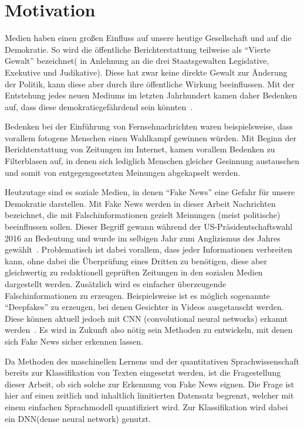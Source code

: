 \section{Motivation}
Medien haben einen großen Einfluss auf unsere heutige Gesellschaft und auf die Demokratie.
So wird die öffentliche Berichterstattung teilweise als \enquote{Vierte Gewalt} bezeichnet( 
in Anlehnung an die drei Staatsgewalten Legislative, Exekutive und Judikative). Diese hat 
zwar keine direkte Gewalt zur Änderung der Politik, kann diese aber durch ihre öffentliche 
Wirkung beeinflussen. Mit der Entstehung jedes neuen Mediums im letzten Jahrhundert kamen daher 
Bedenken auf, dass diese demokratiegefährdend sein könnten~\cite{hunt_fake}.
 
Bedenken bei der Einführung von Fernsehnachrichten waren beispielsweise, dass vorallem fotogene Menschen
einen Wahlkampf gewinnen würden. Mit Beginn der Berichterstattung von Zeitungen im Internet,
kamen vorallem Bedenken zu Filterblasen auf, in denen sich lediglich Menschen gleicher 
Gesinnung austauschen und somit von entgegengesetzten Meinungen abgekapselt werden.

Heutzutage sind es soziale Medien, in denen \enquote{Fake News} eine Gefahr für unsere Demokratie 
darstellen. Mit Fake News werden in dieser Arbeit Nachrichten bezeichnet, die mit Falschinformationen
gezielt Meinungen (meist politische) beeinflussen sollen. Dieser Begriff gewann während der 
US-Präsidentschaftswahl 2016 an Bedeutung und wurde im selbigen Jahr zum Anglizismus des Jahres gewählt~\cite{nzz}.
Problematisch ist dabei vorallem, dass jeder Informationen verbreiten 
kann, ohne dabei die Überprüfung eines Dritten zu benötigen, diese aber gleichwertig
zu redaktionell geprüften Zeitungen in den sozialen Medien dargestellt werden. Zusätzlich 
wird es einfacher überzeugende Falschinformationen zu erzeugen. Beispielsweise ist es möglich
sogenannte \enquote{Deepfakes} zu erzeugen, bei denen Gesichter in Videos ausgetauscht werden.
Diese können aktuell jedoch mit CNN (convolutional neural networks) erkannt werden~\cite{deepfake}.
Es wird in Zukunft also nötig sein Methoden zu entwickeln, mit denen sich Fake News sicher erkennen lassen.

Da Methoden des maschinellen Lernens und der quantitativen Sprachwissenschaft bereits zur Klassifikation
von Texten eingesetzt werden, ist die Fragestellung dieser Arbeit, ob sich solche zur Erkennung 
von Fake News eignen. Die Frage ist hier auf einen zeitlich und inhaltlich 
limitierten Datensatz begrenzt, welcher mit einem einfachen Sprachmodell quantifiziert wird.
Zur Klassifikation wird dabei ein DNN(dense neural network) genutzt.